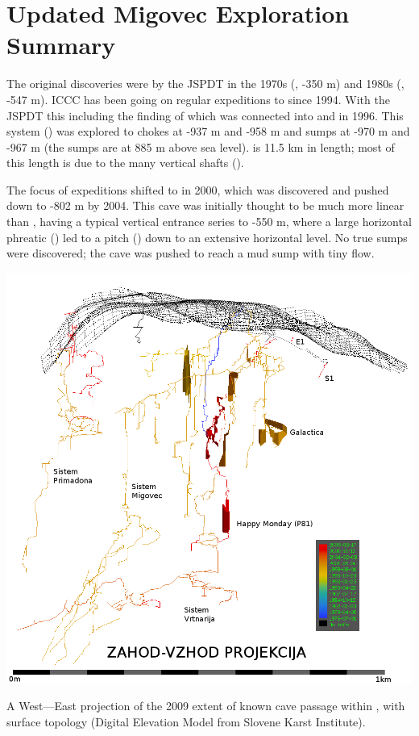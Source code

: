 \section{Updated Migovec Exploration Summary}

The original  discoveries were by the JSPDT in the 1970s (,
-350 m) and 1980s (, -547 m). ICCC has been going on regular expeditions
to  since 1994. With the JSPDT this including the finding of
 which was connected into  and  in 1996. This system ()
was explored to chokes at -937 m and -958 m and sumps at -970 m and -967 m (the sumps are at 885 m above sea level).  is 11.5 km
in length; most of this length is due to the many vertical shafts ().

The focus of expeditions shifted to  in 2000, which was discovered
and pushed down to -802 m by 2004. This cave was initially thought to be much more linear than , having a typical vertical entrance
series to -550 m, where a large horizontal phreatic () led to a pitch () down to an extensive horizontal level. No true sumps were discovered; the cave was pushed to reach a mud sump with tiny flow.

\begin{center}
\begin{pagefigure}
\centering
\includegraphics[width=0.75\columnwidth]{2010/mig_background2010/mig_2009_for_jamar.png}
\caption{A West---East projection of the 2009 extent of known cave passage within , with surface topology
(Digital Elevation Model from Slovene Karst Institute).}
\end{pagefigure}
\end{center}

